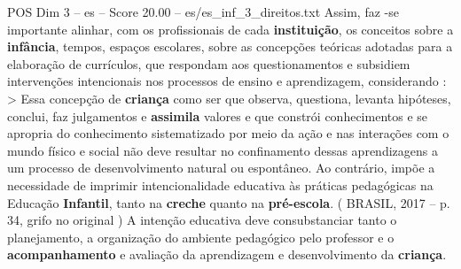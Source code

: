 \begin{textsample}{POS Dim 3 – es – Score 20.00 – es/es\_inf\_3\_direitos.txt}
Assim, faz -se importante alinhar, com os profissionais de cada \textbf{instituição}, os conceitos sobre a \textbf{infância}, tempos, espaços escolares, sobre as concepções teóricas adotadas para a elaboração de currículos, que respondam aos questionamentos e subsidiem intervenções intencionais nos processos de ensino e aprendizagem, considerando : > Essa concepção de \textbf{criança} como ser que observa, questiona, levanta hipóteses, conclui, faz julgamentos e \textbf{assimila} valores e que constrói conhecimentos e se apropria do conhecimento sistematizado por meio da ação e nas interações com o mundo físico e social não deve resultar no confinamento dessas aprendizagens a um processo de desenvolvimento natural ou espontâneo.
Ao contrário, impõe a necessidade de imprimir intencionalidade educativa às práticas pedagógicas na Educação \textbf{Infantil}, tanto na \textbf{creche} quanto na \textbf{pré-escola}. ( BRASIL, 2017 – p. 34, grifo no original ) A intenção educativa deve consubstanciar tanto o planejamento, a organização do ambiente pedagógico pelo professor e o \textbf{acompanhamento} e avaliação da aprendizagem e desenvolvimento da \textbf{criança}.

\end{textsample}
